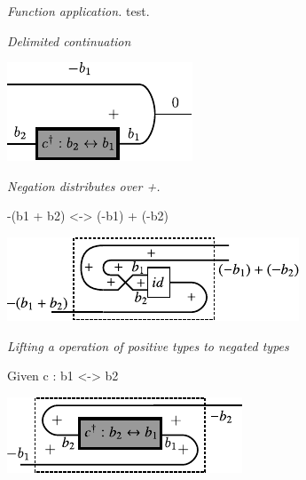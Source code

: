 \documentclass[preprint]{sigplanconf}
\begin{document}
\emph{Function application.}
test.
\begin{multicols}{2}
\begin{center}
\end{center}
\begin{center}
\end{center}
\end{multicols}

\emph{Delimited continuation}

\begin{center}
  \includegraphics{diagrams/delimc.pdf}
\end{center}

\emph{Negation distributes over {{+}}. }

{{-(b1 + b2) <-> (-b1) + (-b2)}}

\begin{center}
  \includegraphics{diagrams/dist_neg_plus.pdf}
\end{center}

\emph{Lifting a operation of positive types to negated types}

Given {{c : b1 <-> b2}}

\begin{center}
  \includegraphics{diagrams/neg_lift.pdf}
\end{center}
\end{document}
